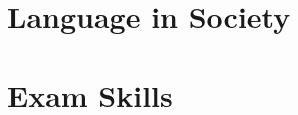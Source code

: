 \documentclass[10pt]{book}
\begin{document}
\part{Language in Society}
\begin{multicols}{2}














\end{multicols}

\part*{Exam Skills}
\begin{multicols}{2}

\end{multicols}
\end{document}
